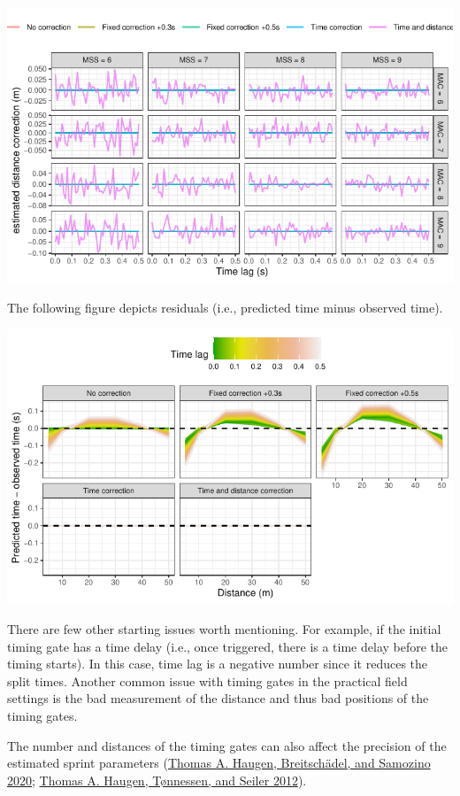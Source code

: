 \documentclass[fleqn,10pt,lineno]{wlpeerj} %
\begin{document}
\begin{center}\includegraphics[width=0.9\linewidth]{paper_files/figure-latex/unnamed-chunk-47-1} \end{center}

The following figure depicts residuals (i.e., predicted time minus observed time).

\begin{center}\includegraphics[width=0.9\linewidth]{paper_files/figure-latex/unnamed-chunk-48-1} \end{center}

There are few other starting issues worth mentioning. For example, if the initial timing gate has a time delay (i.e., once triggered, there is a time delay before the timing starts). In this case, time lag is a negative number since it reduces the split times. Another common issue with timing gates in the practical field settings is the bad measurement of the distance and thus bad positions of the timing gates.

The number and distances of the timing gates can also affect the precision of the estimated sprint parameters (\protect\hyperlink{ref-haugenPowerForceVelocityProfilingSprinting2020}{Thomas A. Haugen, Breitschädel, and Samozino 2020}; \protect\hyperlink{ref-haugenDifferenceStartImpact2012}{Thomas A. Haugen, Tønnessen, and Seiler 2012}).
\end{document}
